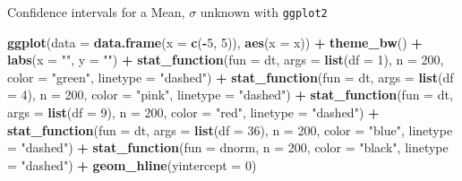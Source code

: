 \documentclass[
  ignorenonframetext,
]{beamer}
\newenvironment{Shaded}{\begin{snugshade}}{\end{snugshade}}
\newcommand{\AttributeTok}[1]{\textcolor[rgb]{0.13,0.29,0.53}{#1}}
\newcommand{\DecValTok}[1]{\textcolor[rgb]{0.00,0.00,0.81}{#1}}
\newcommand{\FunctionTok}[1]{\textcolor[rgb]{0.13,0.29,0.53}{\textbf{#1}}}
\newcommand{\NormalTok}[1]{#1}
\newcommand{\SpecialCharTok}[1]{\textcolor[rgb]{0.81,0.36,0.00}{\textbf{#1}}}
\newcommand{\StringTok}[1]{\textcolor[rgb]{0.31,0.60,0.02}{#1}}
\begin{document}
\begin{frame}[fragile]{Confidence intervals for a Mean, \(\sigma\)
unknown}
\protect\hypertarget{confidence-intervals-for-a-mean-sigma-unknown-5}{}
with \texttt{ggplot2}

\tiny

\begin{Shaded}
\begin{Highlighting}[]
\FunctionTok{ggplot}\NormalTok{(}\AttributeTok{data =} \FunctionTok{data.frame}\NormalTok{(}\AttributeTok{x =} \FunctionTok{c}\NormalTok{(}\SpecialCharTok{{-}}\DecValTok{5}\NormalTok{, }\DecValTok{5}\NormalTok{)), }\FunctionTok{aes}\NormalTok{(}\AttributeTok{x =}\NormalTok{ x)) }\SpecialCharTok{+} 
  \FunctionTok{theme\_bw}\NormalTok{() }\SpecialCharTok{+}
  \FunctionTok{labs}\NormalTok{(}\AttributeTok{x =} \StringTok{""}\NormalTok{, }\AttributeTok{y =} \StringTok{""}\NormalTok{) }\SpecialCharTok{+}
  \FunctionTok{stat\_function}\NormalTok{(}\AttributeTok{fun =}\NormalTok{ dt, }\AttributeTok{args =} \FunctionTok{list}\NormalTok{(}\AttributeTok{df =} \DecValTok{1}\NormalTok{), }\AttributeTok{n =} \DecValTok{200}\NormalTok{, }\AttributeTok{color =} \StringTok{"green"}\NormalTok{, }\AttributeTok{linetype =} \StringTok{"dashed"}\NormalTok{) }\SpecialCharTok{+} 
  \FunctionTok{stat\_function}\NormalTok{(}\AttributeTok{fun =}\NormalTok{ dt, }\AttributeTok{args =} \FunctionTok{list}\NormalTok{(}\AttributeTok{df =} \DecValTok{4}\NormalTok{), }\AttributeTok{n =} \DecValTok{200}\NormalTok{, }\AttributeTok{color =} \StringTok{"pink"}\NormalTok{, }\AttributeTok{linetype =} \StringTok{"dashed"}\NormalTok{) }\SpecialCharTok{+} 
  \FunctionTok{stat\_function}\NormalTok{(}\AttributeTok{fun =}\NormalTok{ dt, }\AttributeTok{args =} \FunctionTok{list}\NormalTok{(}\AttributeTok{df =} \DecValTok{9}\NormalTok{), }\AttributeTok{n =} \DecValTok{200}\NormalTok{, }\AttributeTok{color =} \StringTok{"red"}\NormalTok{, }\AttributeTok{linetype =} \StringTok{"dashed"}\NormalTok{) }\SpecialCharTok{+} 
  \FunctionTok{stat\_function}\NormalTok{(}\AttributeTok{fun =}\NormalTok{ dt, }\AttributeTok{args =} \FunctionTok{list}\NormalTok{(}\AttributeTok{df =} \DecValTok{36}\NormalTok{), }\AttributeTok{n =} \DecValTok{200}\NormalTok{, }\AttributeTok{color =} \StringTok{"blue"}\NormalTok{, }\AttributeTok{linetype =} \StringTok{"dashed"}\NormalTok{) }\SpecialCharTok{+} 
  \FunctionTok{stat\_function}\NormalTok{(}\AttributeTok{fun =}\NormalTok{ dnorm, }\AttributeTok{n =} \DecValTok{200}\NormalTok{, }\AttributeTok{color =} \StringTok{"black"}\NormalTok{, }\AttributeTok{linetype =} \StringTok{"dashed"}\NormalTok{) }\SpecialCharTok{+}
  \FunctionTok{geom\_hline}\NormalTok{(}\AttributeTok{yintercept =} \DecValTok{0}\NormalTok{)}
\end{Highlighting}
\end{Shaded}


\end{frame}
\end{document}
